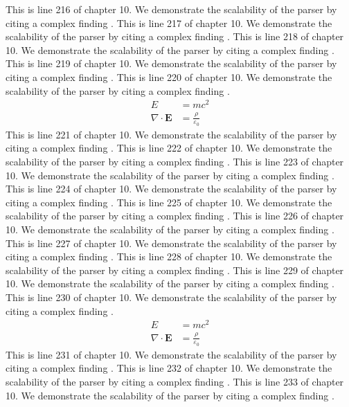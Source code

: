 This is line 216 of chapter 10. We demonstrate the scalability of the parser by citing a complex finding \cite{ref10_216}.
This is line 217 of chapter 10. We demonstrate the scalability of the parser by citing a complex finding \cite{ref10_217}.
This is line 218 of chapter 10. We demonstrate the scalability of the parser by citing a complex finding \cite{ref10_218}.
This is line 219 of chapter 10. We demonstrate the scalability of the parser by citing a complex finding \cite{ref10_219}.
This is line 220 of chapter 10. We demonstrate the scalability of the parser by citing a complex finding \cite{ref10_220}.
\begin{align*}
  E &= mc^2 \\
  \nabla \cdot \mathbf{E} &= \frac{\rho}{\varepsilon_0}
\end{align*}
This is line 221 of chapter 10. We demonstrate the scalability of the parser by citing a complex finding \cite{ref10_221}.
This is line 222 of chapter 10. We demonstrate the scalability of the parser by citing a complex finding \cite{ref10_222}.
This is line 223 of chapter 10. We demonstrate the scalability of the parser by citing a complex finding \cite{ref10_223}.
This is line 224 of chapter 10. We demonstrate the scalability of the parser by citing a complex finding \cite{ref10_224}.
This is line 225 of chapter 10. We demonstrate the scalability of the parser by citing a complex finding \cite{ref10_225}.
This is line 226 of chapter 10. We demonstrate the scalability of the parser by citing a complex finding \cite{ref10_226}.
This is line 227 of chapter 10. We demonstrate the scalability of the parser by citing a complex finding \cite{ref10_227}.
This is line 228 of chapter 10. We demonstrate the scalability of the parser by citing a complex finding \cite{ref10_228}.
This is line 229 of chapter 10. We demonstrate the scalability of the parser by citing a complex finding \cite{ref10_229}.
This is line 230 of chapter 10. We demonstrate the scalability of the parser by citing a complex finding \cite{ref10_230}.
\begin{align*}
  E &= mc^2 \\
  \nabla \cdot \mathbf{E} &= \frac{\rho}{\varepsilon_0}
\end{align*}
This is line 231 of chapter 10. We demonstrate the scalability of the parser by citing a complex finding \cite{ref10_231}.
This is line 232 of chapter 10. We demonstrate the scalability of the parser by citing a complex finding \cite{ref10_232}.
This is line 233 of chapter 10. We demonstrate the scalability of the parser by citing a complex finding \cite{ref10_233}.
